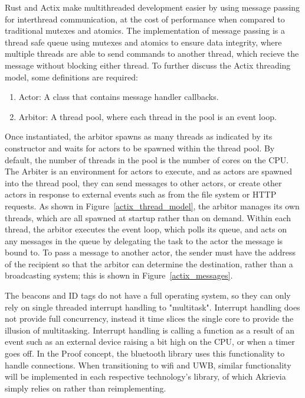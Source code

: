 \bigskip
Rust and Actix make multithreaded development easier by using message passing for interthread communication, at the cost of performance when compared to traditional mutexes and atomics.
The implementation of message passing is a thread safe queue using mutexes and atomics to ensure data integrity, where multiple threads are able to send commands to another thread, which recieve the message without blocking either thread.
To further discuss the Actix threading model, some definitions are required:
\begin{enumerate}
	\item Actor: A class that contains message handler callbacks.
	\item Arbitor: A thread pool, where each thread in the pool is an event loop.
\end{enumerate}
Once instantiated, the arbitor spawns as many threads as indicated by its constructor and waits for actors to be spawned within the thread pool.
By default, the number of threads in the pool is the number of cores on the CPU.
The \Gls{Arbiter} is an environment for actors to execute, and as actors are spawned into the thread pool, they can send messages to other actors, or create other actors in response to external events such as from the file system or HTTP requests.
As shown in Figure~\ref{actix_thread_model}, the arbitor manages its own threads, which are all spawned at startup rather than on demand.
Within each thread, the arbitor executes the event loop, which polls its queue, and acts on any messages in the queue by delegating the task to the actor the message is bound to.
To pass a message to another actor, the sender must have the address of the recipient so that the arbitor can determine the destination, rather than a broadcasting system; this is shown in Figure~\ref{actix_messages}. 

\bigskip
The beacons and ID tags do not have a full operating system, so they can only rely on single threaded interrupt handling to "multitask".
Interrupt handling does not provide full concurrency, instead it time slices the single core to provide the illusion of multitasking.
Interrupt handling is calling a function as a result of an event such as an external device raising a bit high on the CPU, or when a timer goes off.
In the Proof concept, the bluetooth library uses this functionality to handle connections.
When transitioning to wifi and UWB, similar functionality will be implemented in each respective technology's library, of which Akrievia simply relies on rather than reimplementing.

